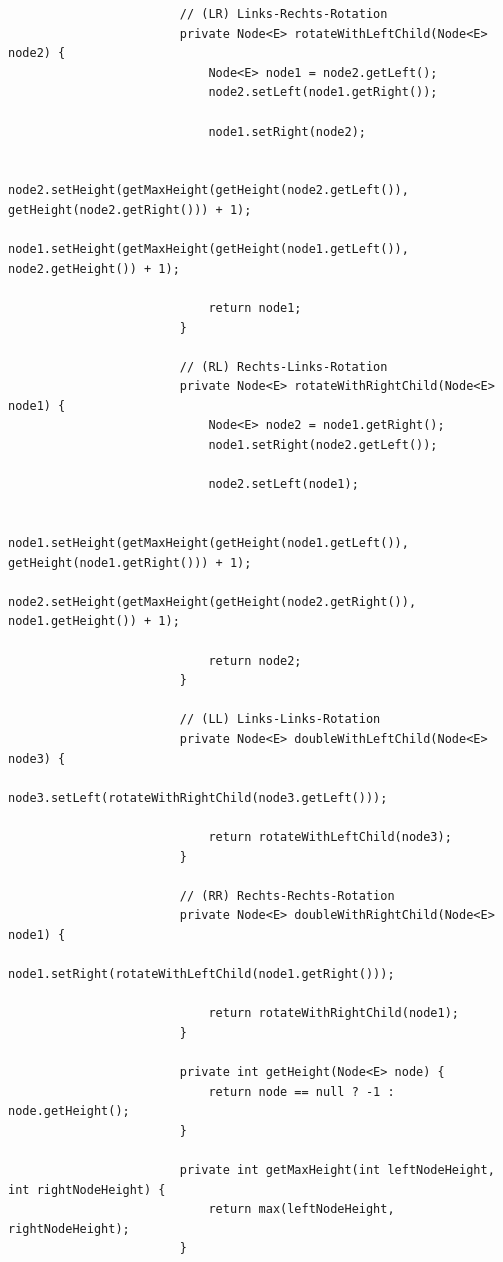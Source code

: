 \documentclass[a4paper, landscape, 8pt]{scrartcl}
\begin{document}
\begin{multicols*}{4}
\begin{lstlisting}
                        // (LR) Links-Rechts-Rotation
                        private Node<E> rotateWithLeftChild(Node<E> node2) {
                            Node<E> node1 = node2.getLeft();
                            node2.setLeft(node1.getRight());

                            node1.setRight(node2);

                            node2.setHeight(getMaxHeight(getHeight(node2.getLeft()), getHeight(node2.getRight())) + 1);
                            node1.setHeight(getMaxHeight(getHeight(node1.getLeft()), node2.getHeight()) + 1);

                            return node1;
                        }

                        // (RL) Rechts-Links-Rotation
                        private Node<E> rotateWithRightChild(Node<E> node1) {
                            Node<E> node2 = node1.getRight();
                            node1.setRight(node2.getLeft());

                            node2.setLeft(node1);

                            node1.setHeight(getMaxHeight(getHeight(node1.getLeft()), getHeight(node1.getRight())) + 1);
                            node2.setHeight(getMaxHeight(getHeight(node2.getRight()), node1.getHeight()) + 1);

                            return node2;
                        }

                        // (LL) Links-Links-Rotation
                        private Node<E> doubleWithLeftChild(Node<E> node3) {
                            node3.setLeft(rotateWithRightChild(node3.getLeft()));

                            return rotateWithLeftChild(node3);
                        }

                        // (RR) Rechts-Rechts-Rotation
                        private Node<E> doubleWithRightChild(Node<E> node1) {
                            node1.setRight(rotateWithLeftChild(node1.getRight()));

                            return rotateWithRightChild(node1);
                        }

                        private int getHeight(Node<E> node) {
                            return node == null ? -1 : node.getHeight();
                        }

                        private int getMaxHeight(int leftNodeHeight, int rightNodeHeight) {
                            return max(leftNodeHeight, rightNodeHeight);
                        }


\end{lstlisting}
\end{multicols*}
\end{document}
